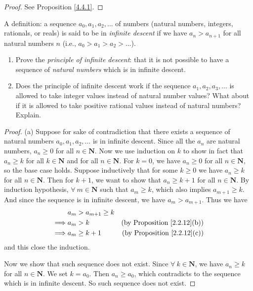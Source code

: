 \begin{proof}
    See Proposition \ref{4.4.1}.
\end{proof}

\begin{exercise}\label{ex 4.4.2}
    A definition: a sequence \(a_0, a_1, a_2, \dots\) of numbers (natural numbers, integers, rationals, or reals) is said to be in \emph{infinite descent} if we have \(a_n > a_{n + 1}\) for all natural numbers \(n\)
    (i.e., \(a_0 > a_1 > a_2 > \dots\)).
    \begin{enumerate}
        \item Prove the \emph{principle of infinite descent}:
              that it is not possible to have a sequence of \emph{natural numbers} which is in infinite descent.
        \item Does the principle of infinite descent work if the sequence \(a_1, a_2, a_3, \dots\) is allowed to take integer values instead of natural number values?
              What about if it is allowed to take positive rational values instead of natural numbers?
              Explain.
    \end{enumerate}
\end{exercise}

\begin{proof}{(a)}
    Suppose for sake of contradiction that there exists a sequence of natural numbers \(a_0, a_1, a_2, \dots\) is in infinite descent.
    Since all the \(a_n\) are natural numbers, \(a_n \geq 0\) for all \(n \in \mathbf{N}\).
    Now we use induction on \(k\) to show in fact that \(a_n \geq k\) for all \(k \in \mathbf{N}\) and for all \(n \in \mathbf{N}\).
    For \(k = 0\), we have \(a_n \geq 0\) for all \(n \in \mathbf{N}\), so the base case holds.
    Suppose inductively that for some \(k \geq 0\) we have \(a_n \geq k\) for all \(n \in \mathbf{N}\).
    Then for \(k + 1\), we want to show that \(a_n \geq k + 1\) for all \(n \in \mathbf{N}\).
    By induction hypothesis, \(\forall\ m \in \mathbf{N}\) such that \(a_m \geq k\), which also implies \(a_{m + 1} \geq k\).
    And since the sequence is in infinite descent, we have \(a_m > a_{m + 1}\).
    Thus we have
    \begin{align*}
                 & a_m > a_{m + 1} \geq k                                           \\
        \implies & a_m > k                & \text{(by Proposition \ref{2.2.12}(b))} \\
        \implies & a_m \geq k + 1         & \text{(by Proposition \ref{2.2.12}(c))}
    \end{align*}
    and this close the induction.

    Now we show that such sequence does not exist.
    Since \(\forall\ k \in \mathbf{N}\), we have \(a_n \geq k\) for all \(n \in \mathbf{N}\).
    We set \(k = a_0\).
    Then \(a_n \geq a_0\), which contradicts to the sequence which is in infinite descent.
    So such sequence does not exist.
\end{proof}

